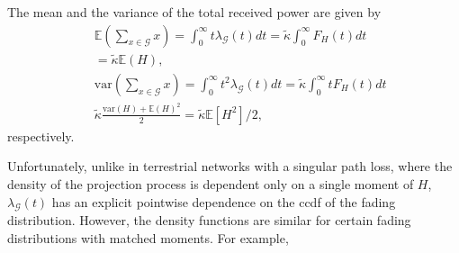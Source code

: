 \documentclass[conference]{IEEEtran}
\theoremstyle{definition}
\theoremstyle{plain}
\begin{document}
          The mean and the variance of the total received power are given by
          \begin{align}
            &\mathbb{E}\left(\sum_{x \in \mathcal{G}} x \right) = \int_{0}^{\infty} t\lambda_{\mathcal{G}}(t) dt = \tilde{\kappa} \int_{0}^{\infty}F_H(t) dt \nonumber \\
            &=\tilde{\kappa} \mathbb{E}(H), \\\
            &\text{var}\left(\sum_{x \in \mathcal{G}} x \right) = \int_{0}^{\infty} t^2\lambda_{\mathcal{G}}(t) dt= \tilde{\kappa} \int_0^{\infty}tF_H(t) dt  \nonumber \\
           & \tilde{\kappa} \frac{\text{var}(H) + \mathbb{E}(H)^2}{2} = \tilde{\kappa}  \mathbb{E}[H^2]/2,
          \end{align}
          respectively. 

          Unfortunately, unlike in terrestrial networks with a singular path loss, where the density of the projection process is dependent only on a single moment of $H$, $\lambda_{\mathcal{G}}(t)$ has an explicit pointwise dependence on the ccdf of the fading distribution. However, the density functions are similar for certain fading distributions with matched moments. For example,
\end{document}
